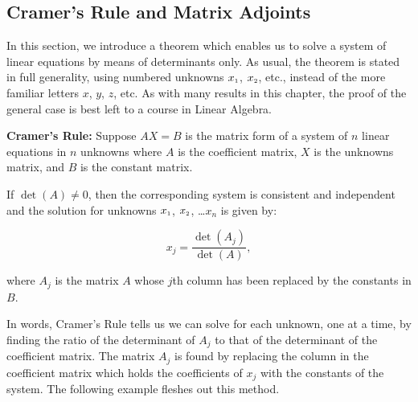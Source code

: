 \documentclass{ximera}
\begin{document}
\newpage

\subsection{Cramer's Rule and Matrix Adjoints}
\label{CramersRuleMatrixAdjoints}

In this section, we introduce a theorem which enables us to solve a system of linear equations by means of determinants only.  As usual, the theorem is stated in full generality, using numbered unknowns $x_{\mbox{\tiny$1$}}$, $x_{\mbox{\tiny$2$}}$, etc., instead of the more familiar letters $x$, $y$, $z$, etc.   As with many results in this chapter, the proof of the general case is best left to a course in Linear Algebra.

\smallskip

\colorbox{ResultColor}{\bbm

\begin{thm} \label{CramersRule}  \textbf{Cramer's Rule:} Suppose  $AX = B$ is the matrix form of a system of $n$ linear equations in $n$ unknowns where $A$ is the coefficient matrix, $X$ is the unknowns matrix, and $B$ is the constant matrix. 

If $\det(A) \neq 0$, then the corresponding system is consistent and independent and the solution for unknowns $x_{\mbox{\tiny$1$}}$, $x_{\mbox{\tiny$2$}}$, \ldots $x_{n}$ is given by:

\[ x_{j} = \dfrac{\det\left(A_{j}\right)}{\det(A)},\]

where $A_{j}$ is the matrix $A$ whose $j$th column has been replaced by the constants in $B$.

\end{thm}

\ebm}

\smallskip

In words, Cramer's Rule tells us we can solve for each unknown, one at a time, by finding the ratio of the determinant of $A_{j}$ to that of the determinant of the coefficient matrix.  The matrix $A_{j}$ is found by replacing the column in the coefficient matrix which holds the coefficients of $x_{j}$ with the constants of the system.  The following example fleshes out this method.

\smallskip
\end{document}
